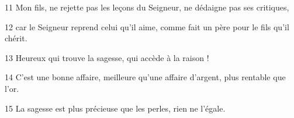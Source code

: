 
11 Mon fils, ne rejette pas les leçons du Seigneur, ne dédaigne pas ses critiques,

12 car le Seigneur reprend celui qu’il aime, comme fait un père pour le fils qu’il chérit.

13 Heureux qui trouve la sagesse, qui accède à la raison !

14 C’est une bonne affaire, meilleure qu’une affaire d’argent, plus rentable que l’or.

15 La sagesse est plus précieuse que les perles, rien ne l’égale.